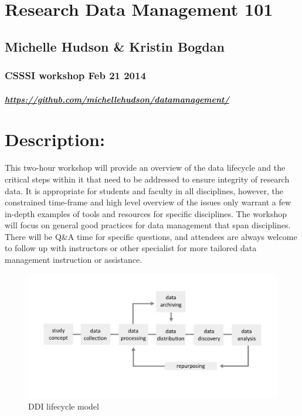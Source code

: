 \documentclass[]{article}
\author{}
\date{}
\begin{document}
\section{Research Data Management
101}\label{research-data-management-101}

\subsection{Michelle Hudson \& Kristin
Bogdan}\label{michelle-hudson-kristin-bogdan}

\subsubsection{CSSSI workshop Feb 21
2014}\label{csssi-workshop-feb-21-2014}

\subparagraph{\url{https://github.com/michellehudson/datamanagement/}}\label{httpsgithub.commichellehudsondatamanagement}

\section{Description:}\label{description}

This two-hour workshop will provide an overview of the data lifecycle
and the critical steps within it that need to be addressed to ensure
integrity of research data. It is appropriate for students and faculty
in all disciplines, however, the constrained time-frame and high level
overview of the issues only warrant a few in-depth examples of tools and
resources for specific disciplines. The workshop will focus on general
good practices for data management that span disciplines. There will be
Q\&A time for specific questions, and attendees are always welcome to
follow up with instructors or other specialist for more tailored data
management instruction or assistance.

\begin{figure}[htbp]
\centering
\includegraphics{ddilifecycle.png}
\caption{DDI lifecycle model}
\end{figure}
\end{document}
